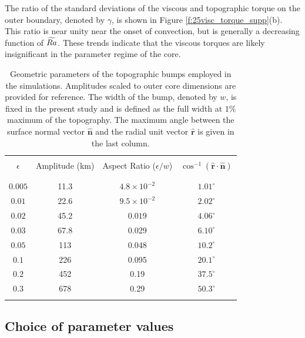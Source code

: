 \textcolor{\revtxt}{The ratio of the standard deviations of the viscous and topographic torque on the outer boundary, denoted by $\gamma$, is shown in Figure \ref{f:25visc_torque_supp}(b). This ratio is near unity near the onset of convection, but is generally a decreasing function of $\widetilde{Ra}$. These trends indicate that the viscous torques are likely insignificant in the parameter regime of the core.}

\begin{table}
\textcolor{\revtxt}{
\begin{center}
\begin{tabular}{c c c c}
\hline
\hline
\\
$\epsilon$ &Amplitude (km)&Aspect Ratio ($\epsilon /w$) &$\cos^{-1}(\mathbf{\hat{r}}\cdot\mathbf{\hat{n}})$\\
\\
\hline
\\
$0.005$&11.3 &$4.8\times 10^{-2}$ &$1.01^{\circ}$\\
$0.01$&22.6  & $9.5\times 10^{-2}$&$2.02^{\circ}$\\
$0.02$&45.2  &$0.019$ &$4.06^{\circ}$\\
$0.03$&67.8  &0.029 &$6.10^{\circ}$\\
$0.05$&113   & 0.048&$10.2^{\circ}$\\
$0.1$&226    &0.095 &$20.1^{\circ}$\\
$0.2$&452    & 0.19&$37.5^{\circ}$\\
$0.3$&678    & 0.29&$50.3^{\circ}$\\
\\
\hline
\hline
\end{tabular}
\end{center}
}
\caption[Geometric parameters of the topographic bumps]{\textcolor{\revtxt}{
	Geometric parameters of the topographic bumps employed in the simulations. Amplitudes scaled to outer core dimensions are provided for reference. 
The width of the bump, denoted by $w$, is fixed in the present study and is defined as the full width at $1\%$ maximum of the topography. 
The maximum angle between the surface normal vector $\mathbf{\hat{n}}$ and the radial unit vector $\hat{\mathbf{r}}$ is given in the last column. 
}
}
\label{t:bump_geo}
\end{table}

\subsection{Choice of parameter values}

